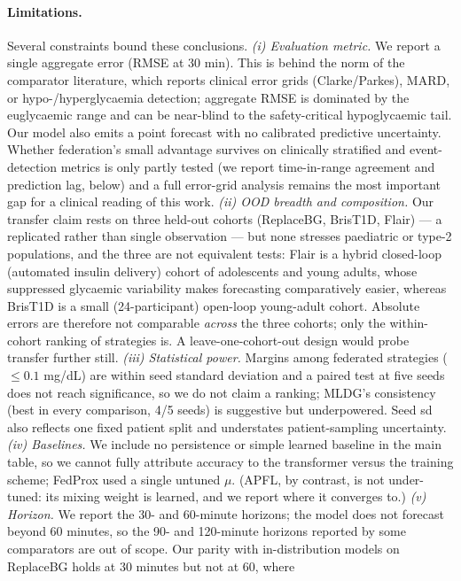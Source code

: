 \documentclass[10pt,letterpaper]{article}
\begin{document}
\paragraph{Limitations.} Several constraints bound these conclusions. \emph{(i)
Evaluation metric.} We report a single aggregate error (RMSE at 30 min). This is
behind the norm of the comparator literature, which reports clinical error grids
(Clarke/Parkes), MARD, or hypo-/hyperglycaemia detection; aggregate RMSE is
dominated by the euglycaemic range and can be near-blind to the safety-critical
hypoglycaemic tail. Our model also emits a point forecast with no calibrated
predictive uncertainty. Whether federation's small advantage survives on
clinically stratified and event-detection metrics is only partly tested (we
report time-in-range agreement and prediction lag, below) and a full error-grid
analysis remains the most important gap for a clinical reading of this work.
\emph{(ii) OOD breadth and composition.} Our transfer claim rests on three
held-out cohorts (ReplaceBG, BrisT1D, Flair) --- a replicated rather than single
observation --- but none stresses paediatric or type-2 populations, and the three
are not equivalent tests: Flair is a hybrid closed-loop (automated insulin
delivery) cohort of adolescents and young adults, whose suppressed glycaemic
variability makes forecasting comparatively easier, whereas BrisT1D is a small
(24-participant) open-loop young-adult cohort. Absolute errors are therefore not
comparable \emph{across} the three cohorts; only the within-cohort ranking of
strategies is. A leave-one-cohort-out design would probe transfer further still. \emph{(iii) Statistical power.} Margins among federated strategies
($\le 0.1$ mg/dL) are within seed standard deviation and a paired test at five
seeds does not reach significance, so we do not claim a ranking; MLDG's
consistency (best in every comparison, 4/5 seeds) is suggestive but underpowered.
Seed sd also reflects one fixed patient split and understates patient-sampling
uncertainty. \emph{(iv) Baselines.} We include no persistence or
simple learned baseline in the main table, so we cannot fully attribute accuracy
to the transformer versus the training scheme; FedProx used a single untuned
$\mu$. (APFL, by contrast, is not under-tuned: its mixing weight is learned, and
we report where it converges to.) \emph{(v) Horizon.} We report the 30- and
60-minute horizons; the model does not forecast beyond 60 minutes, so the 90- and
120-minute horizons reported by some comparators are out of scope. Our parity with
in-distribution models on ReplaceBG holds at 30 minutes but not at 60, where
\end{document}
